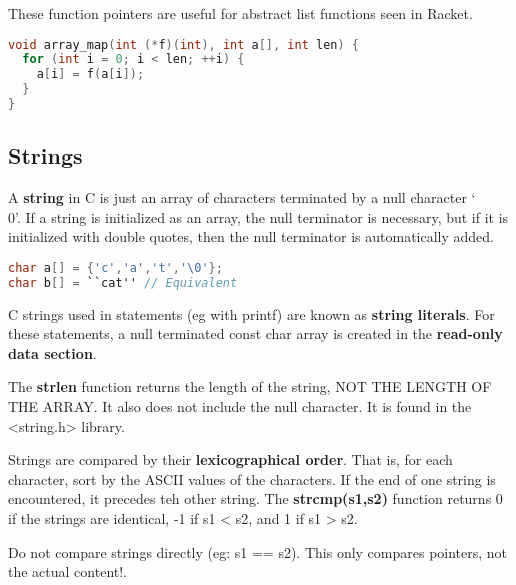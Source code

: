 \documentclass[english, 12pt]{article}
\begin{document}
\begin{note}
These function pointers are useful for abstract list functions seen in Racket.
\begin{lstlisting}[language=C]
void array_map(int (*f)(int), int a[], int len) {
  for (int i = 0; i < len; ++i) {
    a[i] = f(a[i]);
  }
}
\end{lstlisting}
\end{note}
\subsection{Strings}
\begin{defn}
A \textbf{string} in C is just an array of characters terminated by a null character `\\0'. If a string is initialized as an array, the null terminator is necessary, but if it is initialized with double quotes, then the null terminator is automatically added.
\begin{lstlisting}[language=C]
char a[] = {'c','a','t','\0'};
char b[] = ``cat'' // Equivalent
\end{lstlisting}
\end{defn}

\begin{defn}
C strings used in statements (eg with printf) are known as \textbf{string literals}. For these statements, a null terminated const char array is created in the \textbf{read-only data section}.
\end{defn}

\begin{defn}
The \textbf{strlen} function returns the length of the string, NOT THE LENGTH OF THE ARRAY. It also does not include the null character. It is found in the <string.h> library.
\end{defn}

\begin{defn}
Strings are compared by their \textbf{lexicographical order}. That is, for each character, sort by the ASCII values of the characters. If the end of one string is encountered, it precedes teh other string. The \textbf{strcmp(s1,s2)} function returns 0 if the strings are identical, -1 if s1 < s2, and 1 if s1 > s2.
\end{defn}

\begin{note}
Do not compare strings directly (eg: s1 == s2). This only compares pointers, not the actual content!.
\end{note}
\end{document}
